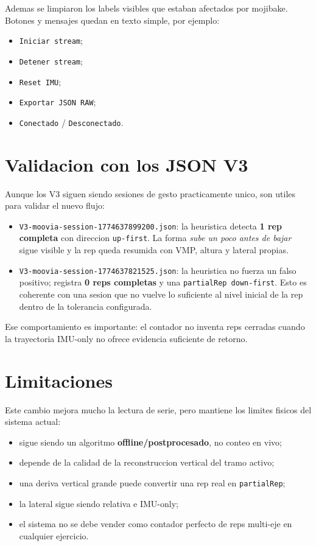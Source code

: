 \documentclass[11pt,a4paper]{article}
\begin{document}
Ademas se limpiaron los labels visibles que estaban afectados por mojibake. Botones y mensajes quedan en texto simple, por ejemplo:
\begin{itemize}[leftmargin=14pt]
  \item \texttt{Iniciar stream};
  \item \texttt{Detener stream};
  \item \texttt{Reset IMU};
  \item \texttt{Exportar JSON RAW};
  \item \texttt{Conectado} / \texttt{Desconectado}.
\end{itemize}

\section{Validacion con los JSON V3}
Aunque los V3 siguen siendo sesiones de gesto practicamente unico, son utiles para validar el nuevo flujo:
\begin{itemize}[leftmargin=14pt]
  \item \texttt{V3-moovia-session-1774637899200.json}: la heuristica detecta \textbf{1 rep completa} con direccion \texttt{up-first}. La forma \emph{sube un poco antes de bajar} sigue visible y la rep queda resumida con VMP, altura y lateral propias.
  \item \texttt{V3-moovia-session-1774637821525.json}: la heuristica no fuerza un falso positivo; registra \textbf{0 reps completas} y una \texttt{partialRep down-first}. Esto es coherente con una sesion que no vuelve lo suficiente al nivel inicial de la rep dentro de la tolerancia configurada.
\end{itemize}

Ese comportamiento es importante: el contador no inventa reps cerradas cuando la trayectoria IMU-only no ofrece evidencia suficiente de retorno.

\section{Limitaciones}
Este cambio mejora mucho la lectura de serie, pero mantiene los limites fisicos del sistema actual:
\begin{itemize}[leftmargin=14pt]
  \item sigue siendo un algoritmo \textbf{offline/postprocesado}, no conteo en vivo;
  \item depende de la calidad de la reconstruccion vertical del tramo activo;
  \item una deriva vertical grande puede convertir una rep real en \texttt{partialRep};
  \item la lateral sigue siendo relativa e IMU-only;
  \item el sistema no se debe vender como contador perfecto de reps multi-eje en cualquier ejercicio.
\end{itemize}
\end{document}
